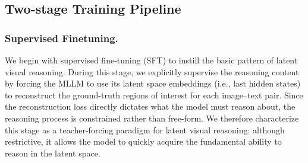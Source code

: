 
\subsection{Two-stage Training Pipeline}\label{ssec:lvr_trainingPipeline}

\subsubsection{Supervised Finetuning.}\label{ssec:lvr_sft} 
We begin with supervised fine-tuning (SFT) to instill the basic pattern of latent visual reasoning. During this stage, we explicitly supervise the reasoning content by forcing the MLLM to use its latent space embeddings (i.e., last hidden states) to reconstruct the ground-truth regions of interest for each image–text pair. Since the reconstruction loss directly dictates what the model must reason about, the reasoning process is constrained rather than free-form. We therefore characterize this stage as a teacher-forcing paradigm for latent visual reasoning: although restrictive, it allows the model to quickly acquire the fundamental ability to reason in the latent space.



